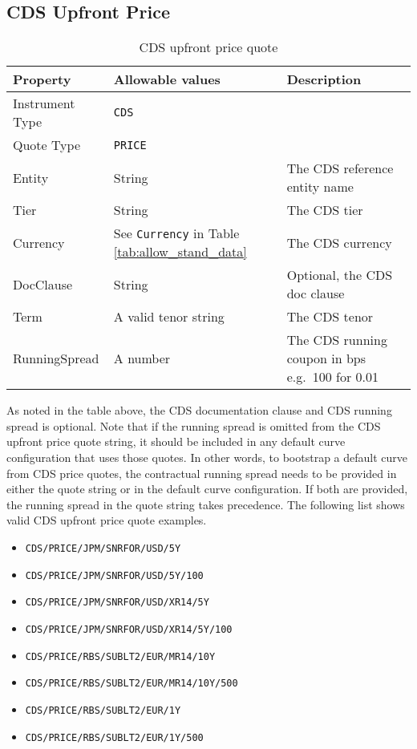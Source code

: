 \subsection{CDS Upfront Price}
\label{md:cds_price_quote}

\begin{table}[H]
\centering
  \begin{tabular}{|p{3cm}|p{3.5cm}|p{7cm}|}
    \hline
    {\bf Property} & {\bf Allowable values} & {\bf Description} \\ \hline
    Instrument Type & \lstinline!CDS! & \\ \hline
    Quote Type & \lstinline!PRICE! & \\ \hline
    Entity & String & The CDS reference entity name \\ \hline
    Tier & String & The CDS tier \\ \hline
    Currency & See \lstinline!Currency! in Table \ref{tab:allow_stand_data} & The CDS currency\\ \hline
    DocClause & String & Optional, the CDS doc clause \\ \hline
    Term & A valid tenor string & The CDS tenor\\ \hline
    RunningSpread & A number & The CDS running coupon in bps e.g.\ 100 for 0.01\\ \hline
  \end{tabular}
  \caption{CDS upfront price quote}
  \label{tab:cds_price_quote}
\end{table}

As noted in the table above, the CDS documentation clause and CDS running spread is optional. Note that if the running spread is omitted from the CDS upfront price quote string, it should be included in any default curve configuration that uses those quotes. In other words, to bootstrap a default curve from CDS price quotes, the contractual running spread needs to be provided in either the quote string or in the default curve configuration. If both are provided, the running spread in the quote string takes precedence. The following list shows valid CDS upfront price quote examples.
\begin{itemize}
\item \lstinline!CDS/PRICE/JPM/SNRFOR/USD/5Y!
\item \lstinline!CDS/PRICE/JPM/SNRFOR/USD/5Y/100!
\item \lstinline!CDS/PRICE/JPM/SNRFOR/USD/XR14/5Y!
\item \lstinline!CDS/PRICE/JPM/SNRFOR/USD/XR14/5Y/100!
\item \lstinline!CDS/PRICE/RBS/SUBLT2/EUR/MR14/10Y!
\item \lstinline!CDS/PRICE/RBS/SUBLT2/EUR/MR14/10Y/500!
\item \lstinline!CDS/PRICE/RBS/SUBLT2/EUR/1Y!
\item \lstinline!CDS/PRICE/RBS/SUBLT2/EUR/1Y/500!
\end{itemize}

